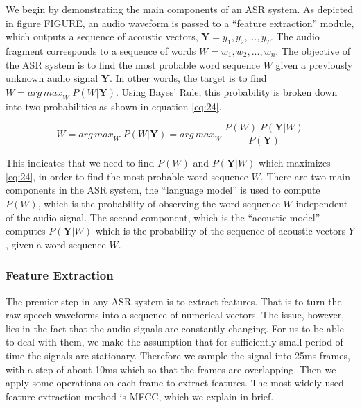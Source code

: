 We begin by demonstrating the main components of an \ac{ASR} system. As depicted in figure FIGURE, an audio waveform is passed to a \enquote{feature extraction} module, which outputs a sequence of acoustic vectors, $\mathbf{Y} = y_1,y_2,...,y_T$. The audio fragment corresponds to a sequence of words $W = w_1,w_2,...,w_n$. The objective of the \ac{ASR} system is to find the most probable word sequence $W$ given a previously unknown audio signal $\mathbf{Y}$.
In other words, the target is to find $W = {arg \, max}_{W} \; P(W|\mathbf{Y})$. Using Bayes' Rule, this probability is broken down into two probabilities as shown in equation \ref{eq:24}.


\begin{equation}
\label{eq:24}
W = {arg \, max}_{W} \; P(W|\mathbf{Y}) = {arg \, max}_{W} \; \frac{P(W) \; P(\mathbf{Y}|W)}{P(\mathbf{Y})}
\end{equation}

This indicates that we need to find $P(W)$ and $P(\mathbf{Y}|W)$ which maximizes \ref{eq:24}, in order to find the most probable word sequence $W$.
There are two main components in the \ac{ASR} system, the \enquote{language model} is used to compute $P(W)$, which is the probability of observing the word sequence $W$ independent of the audio signal. The second component, which is the \enquote{acoustic model} computes $P(\mathbf{Y}|W)$ which is the probability of the sequence of acoustic vectors $Y$, given a word sequence $W$.


\subsubsection{Feature Extraction} 
\label{bg:sub5}

The premier step in any \ac{ASR} system is to extract features. That is to turn the raw speech waveforms into a sequence of numerical vectors. The issue, however, lies in the fact that the audio signals are constantly changing. For us to be able to deal with them, we make the assumption that for sufficiently small period of time the signals are stationary. Therefore we sample the signal into 25ms frames, with a step of about 10ms which so that the frames are overlapping. Then we apply some operations on each frame to extract features. The most widely used feature extraction method is \ac{MFCC}, which we explain in brief.

